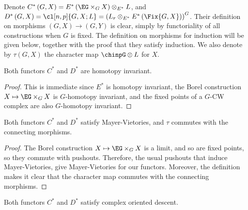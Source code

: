 Denote $C^*\left(G, X\right) = E^*\left(\EG \times_G X\right) \otimes_{E^*} L$,
and $D^*\left(G, X\right) = \cl[n,p]{G,X; L} = \left(L_r \otimes_{E^*} E^*\left(\Fix{G,X}\right)\right)^G$.
Their definition on morphisms $\left(G, X\right) \to \left(G, Y\right)$ is clear, simply by functoriality of all constructions when $G$ is fixed.
The definition on morphisms for induction will be given below, together with the proof that they satisfy induction.
We also denote by $\tau\left(G, X\right)$ the character map $\chinpG \otimes L$ for $X$.

\begin{lemma}
	Both functors $C^*$ and $D^*$ are homotopy invariant.
\end{lemma}

\begin{proof}
	This is immediate since $E^*$ is homotopy invariant, the Borel construction $X \mapsto \EG \times_G X$ is $G$-homotopy invariant, and the fixed points of a $G$-CW complex are also $G$-homotopy invariant.
\end{proof}

\begin{lemma}
	Both functors $C^*$ and $D^*$ satisfy Mayer-Vietories, and $\tau$ commutes with the connecting morphisms.
\end{lemma}

\begin{proof}
	The Borel construction $X \mapsto \EG \times_G X$ is a limit, and so are fixed points, so they commute with pushouts.
	Therefore, the usual pushouts that induce Mayer-Vietories, give Mayer-Vietories for our functors.
	Moreover, the definition makes it clear that the character map commutes with the connecting morphisms.
\end{proof}

\begin{lemma}
	Both functors $C^*$ and $D^*$ satisfy complex oriented descent.
\end{lemma}


